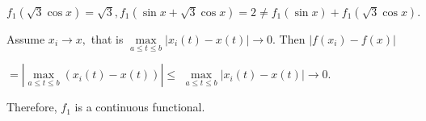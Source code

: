 \documentclass{article}
\begin{document}
$f_{1}\left( \sqrt{3}\cos x\right) =\sqrt{3},f_{1}\left( \sin x+\sqrt{3}\cos
x\right) =2\neq f_{1}\left( \sin x\right) +f_{1}\left( \sqrt{3}\cos x\right)
.$

Assume $x_{i}\rightarrow x,$ that is $\underset{a\leq t\leq b}{\max }%
\left\vert x_{i}\left( t\right) -x\left( t\right) \right\vert \rightarrow 0.$%
Then $\left\vert f\left( x_{i}\right) -f\left( x\right) \right\vert $

$=\left\vert \underset{a\leq t\leq b}{\max }\left( x_{i}\left( t\right)
-x\left( t\right) \right) \right\vert \leq $ $\underset{a\leq t\leq b}{\max }%
\left\vert x_{i}\left( t\right) -x\left( t\right) \right\vert \rightarrow 0.$

Therefore, $f_{1}$ is a continuous functional.
\end{document}
